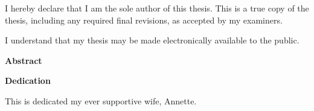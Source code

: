 \cleardoublepage %
 


  \noindent
I hereby declare that I am the sole author of this thesis. This is a true copy of the thesis, including any required final revisions, as accepted by my examiners.

  \bigskip
  
  \noindent
I understand that my thesis may be made electronically available to the public.

\cleardoublepage


\begin{center}\textbf{Abstract}\end{center}
	


\cleardoublepage





\begin{center}\textbf{Dedication}\end{center}

This is dedicated my ever supportive wife, Annette.
\cleardoublepage

\renewcommand\contentsname{Table of Contents}
\tableofcontents
\cleardoublepage
{}

\listoftables
\cleardoublepage
{}		%

\listoffigures
\cleardoublepage
{}		%



